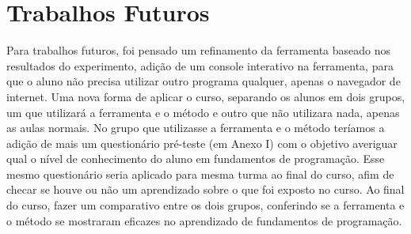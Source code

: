 \documentclass[pnumabnt,normaltoc,espacoumemeio,capchap]{abnt}
\begin{document}
\section{Trabalhos Futuros}
Para trabalhos futuros, foi pensado um refinamento da ferramenta baseado nos resultados do experimento, adição de um console interativo na ferramenta, para que o aluno não precisa utilizar outro programa qualquer, apenas o navegador de internet. Uma nova forma de aplicar o curso, separando os alunos em dois grupos, um que utilizará a ferramenta e o método e outro que não utilizara nada, apenas as aulas normais. No grupo que utilizasse a ferramenta e o método teríamos a adição de mais um questionário pré-teste (em Anexo I) com o objetivo averiguar qual o nível de conhecimento do aluno em fundamentos de programação. Esse mesmo questionário seria aplicado para mesma turma ao final do curso, afim de checar se houve ou não um aprendizado sobre o que foi exposto no curso. Ao final do curso, fazer um comparativo entre os dois grupos, conferindo se a ferramenta e o método se mostraram eficazes no aprendizado de fundamentos de programação.





\end{document}
